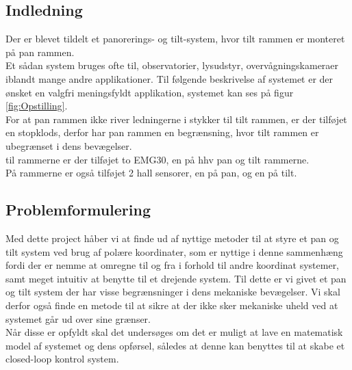 \subsection{Indledning}
Der er blevet tildelt et panorerings- og tilt-system, hvor tilt rammen er monteret på pan rammen.\\
Et sådan system bruges ofte til, observatorier, lysudstyr, overvågningskameraer iblandt mange andre applikationer.
Til følgende beskrivelse af systemet er der ønsket en valgfri meningsfyldt applikation, systemet kan ses på figur \ref{fig:Opstilling}.\\
For at pan rammen ikke river ledningerne i stykker til tilt rammen, er der tilføjet en stopklods, derfor har pan rammen en begrænsning, hvor tilt rammen er ubegrænset i dens bevægelser.\\
til rammerne er der tilføjet to EMG30\cite{emg30Data}, en på hhv pan og tilt rammerne.\\
På rammerne er også tilføjet 2 hall sensorer, en på pan, og en på tilt. 









\subsection{Problemformulering}
Med dette project håber vi at finde ud af nyttige metoder til at styre et pan og tilt system ved brug af polære koordinater, som er nyttige i denne sammenhæng fordi der er nemme at omregne til og fra i forhold til andre koordinat systemer, samt meget intuitiv at benytte til et drejende system. Til dette er vi givet et pan og tilt system der har visse begrænsninger i dens mekaniske bevægelser. Vi skal derfor også finde en metode til at sikre at der ikke sker mekaniske uheld ved at systemet går ud over sine grænser.
\\
Når disse er opfyldt skal det undersøges om det er muligt at lave en matematisk model af systemet og dens opførsel, således at denne kan benyttes til at skabe et closed-loop kontrol system.\\

